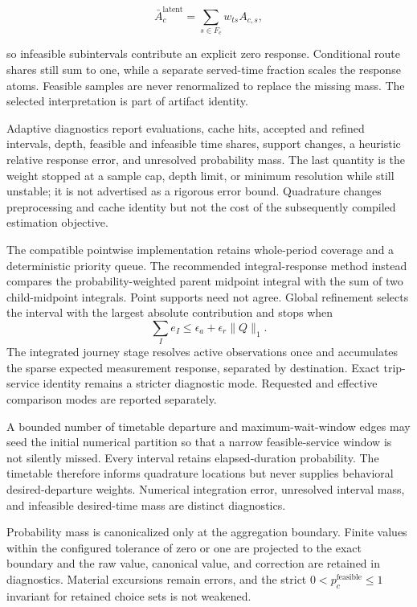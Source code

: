 \[
 \bar A_c^{\mathrm{latent}}=
 \sum_{s\in F_c}w_{ts}A_{c,s},
\]

so infeasible subintervals contribute an explicit zero response.  Conditional
route shares still sum to one, while a separate served-time fraction scales
the response atoms.  Feasible samples are never renormalized to replace the
missing mass.  The selected interpretation is part of artifact identity.

Adaptive diagnostics report evaluations, cache hits, accepted and refined
intervals, depth, feasible and infeasible time shares, support changes, a
heuristic relative response error, and unresolved probability mass.  The last
quantity is the weight stopped at a sample cap, depth limit, or minimum
resolution while still unstable; it is not advertised as a rigorous error
bound.  Quadrature changes preprocessing and cache identity but not the cost of
the subsequently compiled estimation objective.

The compatible pointwise implementation retains whole-period coverage and a
deterministic priority queue.  The recommended integral-response method instead
compares the probability-weighted parent midpoint integral with the sum of two
child-midpoint integrals.  Point supports need not agree.  Global refinement
selects the interval with the largest absolute contribution and stops when
\[
 \sum_I e_I\leq\epsilon_a+\epsilon_r\lVert Q\rVert_1.
\]
The integrated journey stage resolves active observations once and accumulates
the sparse expected measurement response, separated by destination.  Exact
trip-service identity remains a stricter diagnostic mode. Requested and
effective comparison modes are reported separately.

A bounded number of timetable departure and maximum-wait-window edges may seed
the initial numerical partition so that a narrow feasible-service window is
not silently missed.  Every interval retains elapsed-duration probability.
The timetable therefore informs quadrature locations but never supplies
behavioral desired-departure weights. Numerical integration error, unresolved
interval mass, and infeasible desired-time mass are distinct diagnostics.

Probability mass is canonicalized only at the aggregation boundary.  Finite
values within the configured tolerance of zero or one are projected to the
exact boundary and the raw value, canonical value, and correction are retained
in diagnostics.  Material excursions remain errors, and the strict
$0<p_c^{\mathrm{feasible}}\leq1$ invariant for retained choice sets is not
weakened.

